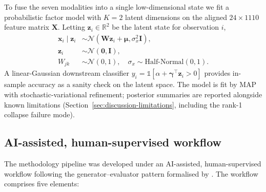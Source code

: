 \documentclass[11pt,a4paper,3p,authoryear]{elsarticle}
\begin{document}
To fuse the seven modalities into a single low-dimensional state we fit a probabilistic factor model with $K=2$ latent dimensions on the aligned $24 \times 1110$ feature matrix $\mathbf{X}$. Letting $\mathbf{z}_i \in \mathbb{R}^2$ be the latent state for observation $i$,
\begin{align}
\mathbf{x}_i \mid \mathbf{z}_i &\sim \mathcal{N}(\mathbf{W}\mathbf{z}_i + \boldsymbol{\mu}, \sigma_x^2 \mathbf{I}), \\
\mathbf{z}_i &\sim \mathcal{N}(\mathbf{0}, \mathbf{I}), \\
W_{jk} &\sim \mathcal{N}(0, 1),\quad \sigma_x \sim \mathrm{Half\text{-}Normal}(0, 1).
\end{align}
A linear-Gaussian downstream classifier $y_i = \mathbb{1}[\alpha + \boldsymbol{\gamma}^\top \mathbf{z}_i > 0]$ provides in-sample accuracy as a sanity check on the latent space. The model is fit by MAP with stochastic-variational refinement; posterior summaries are reported alongside known limitations (Section~\ref{sec:discussion-limitations}, including the rank-1 collapse failure mode).

\subsection{AI-assisted, human-supervised workflow}\label{sec:harness}

The methodology pipeline was developed under an AI-assisted, human-supervised workflow following the generator--evaluator pattern formalised by \citet{Zhou2026nora}. The workflow comprises five elements:
\end{document}
